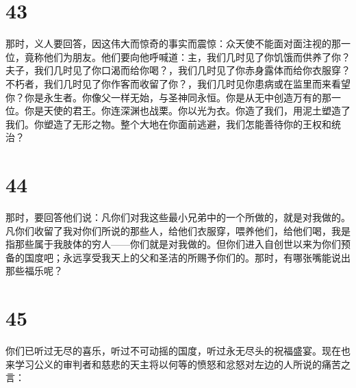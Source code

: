 
\section{43}

那时，义人要回答，因这伟大而惊奇的事实而震惊：众天使不能面对面注视的那一位，竟称他们为朋友。他们要向他呼喊道：主，我们几时见了你饥饿而供养了你？夫子，我们几时见了你口渴而给你喝？，我们几时见了你赤身露体而给你衣服穿？不朽者，我们几时见了你作客而收留了你？，我们几时见你患病或在监里而来看望你？你是永生者。你像父一样无始，与圣神同永恒。你是从无中创造万有的那一位。你是天使的君王。你连深渊也战栗。你以光为衣。你造了我们，用泥土塑造了我们。你塑造了无形之物。整个大地在你面前逃避，我们怎能善待你的王权和统治？\par


\section{44}

那时，要回答他们说：凡你们对我这些最小兄弟中的一个所做的，就是对我做的。凡你们收留了我对你们所说的那些人，给他们衣服穿，喂养他们，给他们喝，我是指那些属于我肢体的穷人——你们就是对我做的。但你们进入自创世以来为你们预备的国度吧；永远享受我天上的父和圣洁的所赐予你们的。那时，有哪张嘴能说出那些福乐呢？\par


\section{45}

你们已听过无尽的喜乐，听过不可动摇的国度，听过永无尽头的祝福盛宴。现在也来学习公义的审判者和慈悲的天主将以何等的愤怒和忿怒对左边的人所说的痛苦之言：\par

